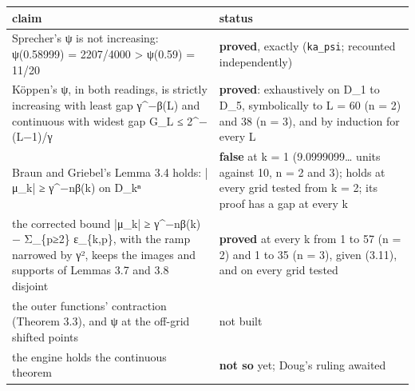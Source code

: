 {\small
\setlength{\tabcolsep}{6pt}
\begin{longtable}{>{\RaggedRight\arraybackslash}p{}>{\RaggedRight\arraybackslash}p{}}
\toprule
claim & status \\
\midrule
\endhead
Sprecher's ψ is not increasing: ψ(0.58999) = 2207/4000 > ψ(0.59) = 11/20 & \textbf{proved}, exactly (\texttt{ka\_\allowbreak{}psi}; recounted independently) \\
Köppen's ψ, in both readings, is strictly increasing with least gap γ\textasciicircum{}−β(L) and continuous with widest gap G\_\allowbreak{}L ≤ 2\textasciicircum{}−(L−1)/γ & \textbf{proved}: exhaustively on D\_\allowbreak{}1 to D\_\allowbreak{}5, symbolically to L = 60 (n = 2) and 38 (n = 3), and by induction for every L \\
Braun and Griebel's Lemma 3.4 holds: |μ\_\allowbreak{}k| ≥ γ\textasciicircum{}−nβ(k) on D\_\allowbreak{}kⁿ & \textbf{false} at k = 1 (9.0999099… units against 10, n = 2 and 3); holds at every grid tested from k = 2; its proof has a gap at every k \\
the corrected bound |μ\_\allowbreak{}k| ≥ γ\textasciicircum{}−nβ(k) − Σ\_\allowbreak{}\{p≥2\} ε\_\allowbreak{}\{k,p\}, with the ramp narrowed by γ², keeps the images and supports of Lemmas 3.7 and 3.8 disjoint & \textbf{proved} at every k from 1 to 57 (n = 2) and 1 to 35 (n = 3), given (3.11), and on every grid tested \\
the outer functions' contraction (Theorem 3.3), and ψ at the off-grid shifted points & not built \\
the engine holds the continuous theorem & \textbf{not so} yet; Doug's ruling awaited \\
\bottomrule
\end{longtable}
}
